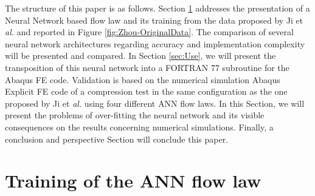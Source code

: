 \documentclass[algorithms,article,submit,pdftex,moreauthors]{Definitions/mdpi}
\makeatletter
\DeclareRobustCommand{\eal}{et \emph{al.}\@\xspace}
\makeatother
\begin{document}
The structure of this paper is as follows.
Section \ref{sec:Training} addresses the presentation of a Neural Network based flow law and its training from the data proposed by Ji \eal \cite{Ji-2018} and reported in Figure \ref{fig:Zhou-OriginalData}.
The comparison of several neural network architectures regarding accuracy and implementation complexity will be presented and compared.
In Section \ref{sec:Use}, we will present the transposition of this neural network into a FORTRAN 77 subroutine for the Abaqus FE code.
Validation is based on the numerical simulation Abaqus Explicit FE code of a compression test in the same configuration as the one proposed by Ji \eal \cite{Ji-2018} using four different ANN flow laws.
In this Section, we will present the problems of over-fitting the neural network and its visible consequences on the results concerning numerical simulations.
Finally, a conclusion and perspective Section will conclude this paper.

\section{Training of the ANN flow law}\label{sec:Training}
\end{document}
